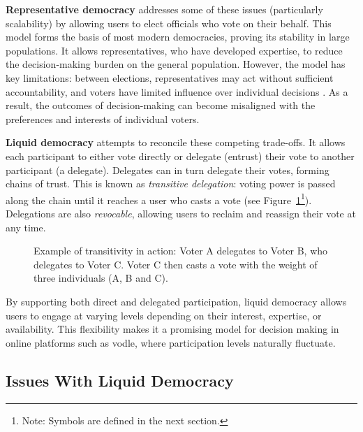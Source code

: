 \textbf{Representative democracy} addresses some of these issues (particularly scalability) by allowing users to elect officials who vote on their behalf. This model forms the basis of most modern democracies, proving its stability in large populations. It allows representatives, who have developed expertise, to reduce the decision-making burden on the general population. However, the model has key limitations: between elections, representatives may act without sufficient accountability, and voters have limited influence over individual decisions \citep{blum_liquid_2016}. As a result, the outcomes of decision-making can become misaligned with the preferences and interests of individual voters.

\textbf{Liquid democracy} attempts to reconcile these competing trade-offs. It allows each participant to either vote directly or delegate (entrust) their vote to another participant (a delegate). Delegates can in turn delegate their votes, forming chains of trust. This is known as \textit{transitive delegation}: voting power is passed along the chain until it reaches a user who casts a vote (see Figure~\ref{fig:delegation-transitivity}\footnote{Note: Symbols are defined in the next section.}). Delegations are also \textit{revocable}, allowing users to reclaim and reassign their vote at any time.

\begin{figure}[H]
  \centering
  \caption{Example of transitivity in action: Voter A delegates to Voter B, who delegates to Voter C. Voter C then casts a vote with the weight of three individuals (A, B and C).}
  \label{fig:delegation-transitivity}
\end{figure}

By supporting both direct and delegated participation, liquid democracy allows users to engage at varying levels depending on their interest, expertise, or availability. This flexibility makes it a promising model for decision making in online platforms such as vodle, where participation levels naturally fluctuate.

\subsection{Issues With Liquid Democracy}

